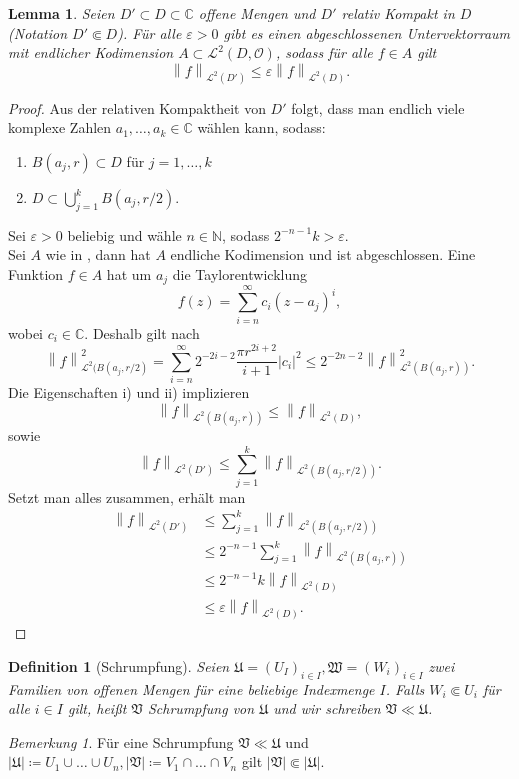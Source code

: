 \documentclass[11pt,a4paper,toc=bibliography]{scrartcl}
\theoremstyle{thm}
\newtheorem{lemma}{Lemma}[section]
\theoremstyle{def}
\newtheorem{defi}{Definition}[section]
\theoremstyle{remark}
\newtheorem*{bem}{Bemerkung}
\newcommand*{\norm}[1]{\left\lVert#1\right\rVert} %
\begin{document}
\begin{lemma}
Seien $D' \subset D\subset \mathbb{C}$ offene Mengen und $D'$ relativ Kompakt in $D$ (Notation $D'\Subset D$). Für alle $\varepsilon >0$ gibt es einen abgeschlossenen Untervektorraum mit endlicher Kodimension $A\subset \mathcal{L}^2(D,\mathcal{O})$, sodass für alle $f\in A$ gilt
\[
\norm{f}_{\mathcal{L}^2(D')} \leq \varepsilon \norm{f}_{\mathcal{L}^2(D)}.
\]
\end{lemma}
\begin{proof}
Aus der relativen Kompaktheit von $D'$ folgt, dass man endlich viele komplexe Zahlen $a_1,\ldots,a_k\in\mathbb{C}$ wählen kann, sodass:
\begin{enumerate}
\item $B(a_j,r)\subset D$ für $j=1,\ldots,k$
\item  $D\subset\bigcup_{j=1}^k B(a_j,r/2)$.
\end{enumerate}
Sei $\varepsilon>0$ beliebig und wähle $n\in\mathbb{N}$, sodass $2^{-n-1}k>\varepsilon$.\\
Sei $A$ wie in , dann hat $A$ endliche Kodimension und ist abgeschlossen. Eine Funktion $f\in A$ hat um $a_j$ die Taylorentwicklung 
\[
f(z)=\sum_{i=n}^{\infty} c_i(z-a_j)^i,
\]
wobei $c_i\in\mathbb{C}$. Deshalb gilt nach 
\[
\norm{f}_{\mathcal{L}^2(B(a_j,r/2)}^2=\sum_{i=n}^{\infty}2^{-2i-2}\frac{\pi r^{2i+2}}{i+1}|c_i|^2\leq 2^{-2n-2}\norm{f}_{\mathcal{L}^2(B(a_j,r))}^2.
\]
Die Eigenschaften i) und ii) implizieren
\[
\norm{f}_{\mathcal{L}^2(B(a_j,r))}\leq \norm{f}_{\mathcal{L}^2(D)},
\]
sowie
\[
\norm{f}_{\mathcal{L}^2(D')}\leq \sum_{j=1}^{k}\norm{f}_{\mathcal{L}^2(B(a_j,r/2))}.
\]
Setzt man alles zusammen, erhält man
\begin{align*}
    \norm{f}_{\mathcal{L}^2(D')} & \leq \sum_{j=1}^{k}\norm{f}_{\mathcal{L}^2(B(a_j,r/2))}\\
                                &\leq 2^{-n-1}\sum_{j=1}^{k}\norm{f}_{\mathcal{L}^2(B(a_j,r))}\\
                                &\leq 2^{-n-1}k \norm{f}_{\mathcal{L}^2(D)}\\
                                &\leq \varepsilon \norm{f}_{\mathcal{L}^2(D)}.
\end{align*}


\end{proof}

\begin{defi}[Schrumpfung]
Seien $\mathfrak{U}=(U_I)_{i\in I},\mathfrak{W}=(W_i)_{i\in I}$ zwei Familien von offenen Mengen für eine beliebige Indexmenge $I$. Falls $W_i\Subset U_i$ für alle $i\in I$ gilt, heißt $\mathfrak{V}$ \emph{Schrumpfung} von $\mathfrak{U}$ und wir schreiben $\mathfrak{V}\ll\mathfrak{U}$.
\end{defi}
\begin{bem}
    Für eine Schrumpfung $\mathfrak{V}\ll\mathfrak{U}$ und $|\mathfrak{U}|\coloneqq U_1\cup\ldots\cup U_n, |\mathfrak{V}|\coloneqq V_1\cap\ldots\cap V_n$ gilt $|\mathfrak{V}|\Subset |\mathfrak{U}|$.
\end{bem}
\end{document}

